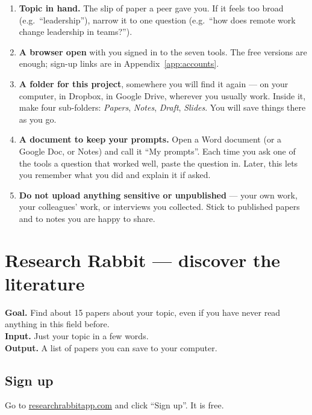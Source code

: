 \documentclass[11pt,a4paper]{article}
\begin{document}
\begin{enumerate}[leftmargin=*, itemsep=2pt]
  \item \textbf{Topic in hand.} The slip of paper a peer gave you. If it feels too broad (e.g.\ ``leadership''), narrow it to one question (e.g.\ ``how does remote work change leadership in teams?'').
  \item \textbf{A browser open} with you signed in to the seven tools. The free versions are enough; sign-up links are in Appendix~\ref{app:accounts}.
  \item \textbf{A folder for this project}, somewhere you will find it again --- on your computer, in Dropbox, in Google Drive, wherever you usually work. Inside it, make four sub-folders: \emph{Papers}, \emph{Notes}, \emph{Draft}, \emph{Slides}. You will save things there as you go.
  \item \textbf{A document to keep your prompts.} Open a Word document (or a Google Doc, or Notes) and call it ``My prompts''. Each time you ask one of the tools a question that worked well, paste the question in. Later, this lets you remember what you did and explain it if asked.
  \item \textbf{Do not upload anything sensitive or unpublished} --- your own work, your colleagues' work, or interviews you collected. Stick to published papers and to notes you are happy to share.
\end{enumerate}

\section{Research Rabbit --- discover the literature}
\label{sec:rr}

\begin{toolheader}
\textbf{Goal.} Find about 15 papers about your topic, even if you have never read anything in this field before.\\
\textbf{Input.} Just your topic in a few words.\\
\textbf{Output.} A list of papers you can save to your computer.
\end{toolheader}

\subsection*{Sign up}
Go to \href{https://www.researchrabbitapp.com/}{researchrabbitapp.com} and click ``Sign up''. It is free.
\end{document}
